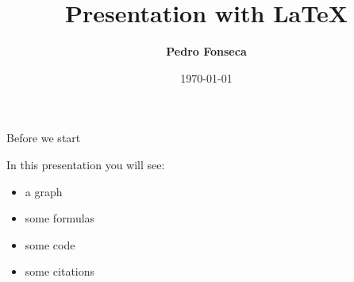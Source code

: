


\title[Presentation with LaTeX]{Presentation with \LaTeX}

\author[Pedro Fonseca]{\textbf {Pedro Fonseca}}

\date{\today}







\begin{frame}{Before we start}

In this presentation you will see:

\begin{itemize}

\item a graph
\item some formulas
\item some code
\item some citations \citep{kass1995}

\end{itemize}

\end{frame}


